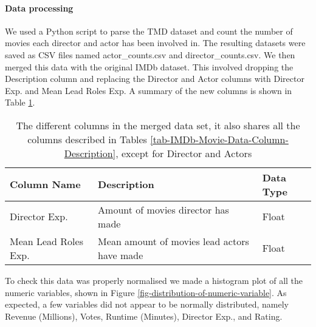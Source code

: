     \paragraph{Data processing}
        We used a Python script to parse the TMD dataset and count the number of
            movies each director and actor has been involved in.
        The resulting datasets were saved as CSV files named actor\_counts.csv and
            director\_counts.csv.
        We then merged this data with the original IMDb
            dataset.
        This involved dropping the Description column and replacing the
            Director and Actor columns with Director Exp. and Mean Lead Roles Exp.
        A summary of the new columns is shown in Table
            \ref*{tab-merged-data-column-description}.
        \begin{table}[H]
            \centering
            \begin{tabular}{lp{9cm}l}
                \toprule
                Column Name           & Description                                                  & Data Type \\
                \midrule
                Director Exp.        & Amount of movies director has made & Float     \\
                Mean Lead Roles Exp. & Mean amount of movies lead actors have made & Float     \\
                \bottomrule
            \end{tabular}
            \caption[short]{The different columns in the merged data set, 
                            it also shares all the columns described in Tables
                            \ref*{tab-IMDb-Movie-Data-Column-Description}, 
                            except for Director and Actors}\label{tab-merged-data-column-description}
        \end{table}
        To check this data was properly normalised we made a histogram plot of all the
            numeric variables, shown in Figure \ref{fig-distribution-of-numeric-variable}.
        As expected, a few variables did not appear to be normally distributed, namely
        Revenue (Millions), Votes, Runtime (Minutes), Director Exp., and Rating.
